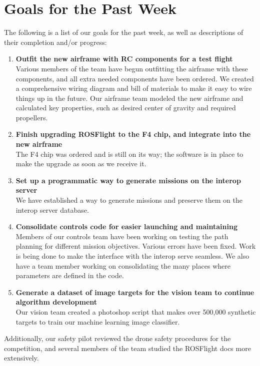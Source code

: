 \documentclass[]{../auvsi_doc}
\begin{document}
\section{Goals for the Past Week}

The following is a list of our goals for the past week, as well as descriptions of their completion and/or progress:

\begin{enumerate}
	\item \textbf{Outfit the new airframe with RC components for a test flight}\\
	Various members of the team have begun outfitting the airframe with these components, and all extra needed components have been ordered. We created a comprehensive wiring diagram and bill of materials to make it easy to wire things up in the future. Our airframe team modeled the new airframe and calculated key properties, such as desired center of gravity and required propellers.
	\item \textbf{Finish upgrading ROSFlight to the F4 chip, and integrate into the new airframe}\\
	The F4 chip was ordered and is still on its way; the software is in place to make the upgrade as soon as we receive it.
	\item \textbf{Set up a programmatic way to generate missions on the interop server}\\
	We have established a way to generate missions and preserve them on the interop server database.
	\item \textbf{Consolidate controls code for easier launching and maintaining}\\
	Members of our controls team have been working on testing the path planning for different mission objectives. Various errors have been fixed. Work is being done to make the interface with the interop serve seamless. We also have a team member working on consolidating the many places where parameters are defined in the code.
	\item \textbf{Generate a dataset of image targets for the vision team to continue algorithm development}\\
	Our vision team created a photoshop script that makes over 500,000 synthetic targets to train our machine learning image classifier.
\end{enumerate}

Additionally, our safety pilot reviewed the drone safety procedures for the competition, and several members of the team studied the ROSFlight docs more extensively.
\end{document}
